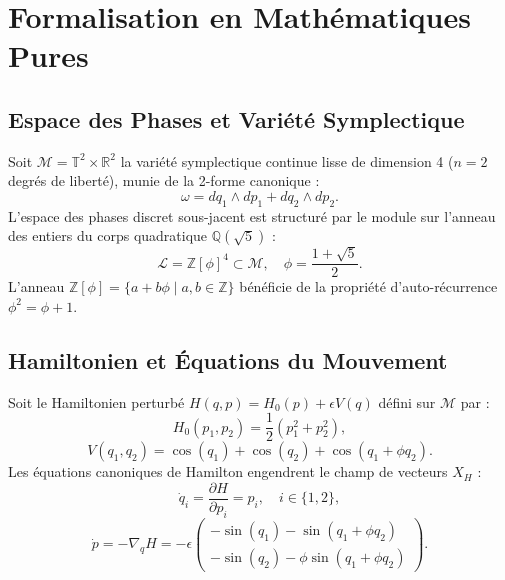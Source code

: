 \documentclass[10pt,twocolumn,a4paper]{article}
\theoremstyle{plain}
\theoremstyle{definition}
\begin{document}
\section{Formalisation en Mathématiques Pures}

\subsection{Espace des Phases et Variété Symplectique}
Soit $\mathcal{M} = \mathbb{T}^2 \times \mathbb{R}^2$ la variété symplectique continue lisse de dimension 4 ($n = 2$ degrés de liberté), munie de la 2-forme canonique :
\begin{equation}
\omega = dq_1 \wedge dp_1 + dq_2 \wedge dp_2.
\label{eq:forme_symplectique}
\end{equation}
L'espace des phases discret sous-jacent est structuré par le module sur l'anneau des entiers du corps quadratique $\mathbb{Q}(\sqrt{5})$ :
\begin{equation}
\mathcal{L} = \mathbb{Z}[\phi]^4 \subset \mathcal{M}, \quad \phi = \frac{1 + \sqrt{5}}{2}.
\label{eq:module_discret}
\end{equation}
L'anneau $\mathbb{Z}[\phi] = \{a + b\phi \mid a, b \in \mathbb{Z}\}$ bénéficie de la propriété d'auto-récurrence $\phi^2 = \phi + 1$.

\subsection{Hamiltonien et Équations du Mouvement}
Soit le Hamiltonien perturbé $H(q, p) = H_0(p) + \epsilon V(q)$ défini sur $\mathcal{M}$ par :
\begin{equation}
H_0(p_1, p_2) = \frac{1}{2}(p_1^2 + p_2^2),
\label{eq:hamiltonien_libre}
\end{equation}
\begin{equation}
V(q_1, q_2) = \cos(q_1) + \cos(q_2) + \cos(q_1 + \phi q_2).
\label{eq:potentiel_perturbateur}
\end{equation}
Les équations canoniques de Hamilton engendrent le champ de vecteurs $X_H$ :
\begin{equation}
\dot{q}_i = \frac{\partial H}{\partial p_i} = p_i, \quad i \in \{1, 2\},
\label{eq:equations_hamilton_q}
\end{equation}
\begin{equation}
\dot{p} = -\nabla_q H = -\epsilon \begin{pmatrix} -\sin(q_1) - \sin(q_1 + \phi q_2) \\ -\sin(q_2) - \phi \sin(q_1 + \phi q_2) \end{pmatrix}.
\label{eq:equations_hamilton_p}
\end{equation}
\end{document}
